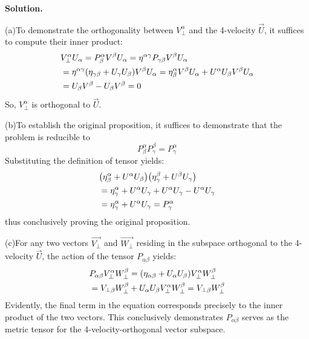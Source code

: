 \documentclass[12pt, a4paper, oneside]{article}
\newenvironment{solution}{\par\noindent\textbf{Solution. }}{\par}
\newcommand{\vc}[1]{\ensuremath{\overrightarrow{#1}}}
\begin{document}
\begin{solution}

    (a)To demonstrate the orthogonality between $V_\perp^\alpha$ and the 4-velocity \vc{U}, it suffices to compute their inner product:
    \begin{equation}
        \begin{split}
            &V_\perp^\alpha U_\alpha = P^\alpha_\beta V^\beta U_\alpha = \eta^{\alpha\gamma}P_{\gamma\beta}V^\beta U_\alpha\\
            &=\eta^{\alpha\gamma}\qty(\eta_{\gamma\beta}+U_\gamma U_\beta)V^\beta U_\alpha=\eta^\alpha_\beta V^\beta U_\alpha + U^\alpha U_\beta V^\beta U_\alpha\\
            &=U_\beta V^\beta - U_\beta V^\beta = 0
        \end{split}
    \end{equation}
    So, $V_\perp^\alpha$ is orthogonal to \vc{U}.

    (b)To establish the original proposition, it suffices to demonstrate that the problem is reducible to
    \begin{equation}
        P^\alpha_\beta P^\beta_\gamma = P^\alpha_\gamma
    \end{equation}
    Substituting the definition of tensor yields:
    \begin{equation}
        \begin{split}
            &\qty(\eta^\alpha_\beta + U^\alpha U_\beta)\qty(\eta^\beta_\gamma + U^\beta U_\gamma)\\
            &=\eta^\alpha_\gamma + U^\alpha U_\gamma + U^\alpha U_\gamma - U^\alpha U_\gamma\\
            &=\eta^\alpha_\gamma + U^\alpha U_\gamma = P^\alpha_\gamma
        \end{split}
    \end{equation}
    thus conclusively proving the original proposition.

    (c)For any two vectors \vc{V_\perp} and \vc{W_\perp} residing in the subspace orthogonal to the 4-velocity \vc{U}, the action of the tensor $P_{\alpha\beta}$ yields:
    \begin{equation}
        \begin{split}
            &P_{\alpha\beta}V_\perp^\alpha W_\perp^\beta = \qty(\eta_{\alpha\beta} + U_\alpha U_\beta)V_\perp^\alpha W_\perp^\beta\\
            &=V_{\perp\beta}W_\perp^\beta + U_\alpha U_\beta V_\perp^\alpha W_\perp^\beta = V_{\perp\beta}W_\perp^\beta
        \end{split}
    \end{equation}
    Evidently, the final term in the equation corresponds precisely to the inner product of the two vectors. This conclusively demonstrates $P_{\alpha\beta}$ serves as the metric tensor for the 4-velocity-orthogonal vector subspace.


\end{solution}
\end{document}
